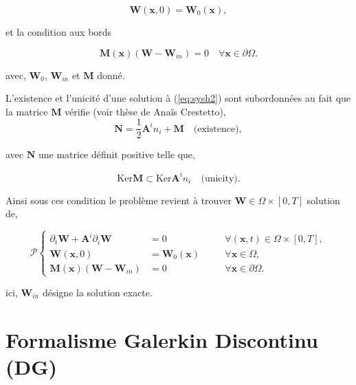 \documentclass[a4paper,oneside,10pt]{report}
\begin{document}
\begin{equation}
\label{eq:ini} 
\mathbf{W}(\mathbf{x},0)=\mathbf{W}_0(\mathbf{x}),
\end{equation}

et la condition aux bords

\begin{equation}
\label{eq:bound} 
\mathbf{M}(\mathbf{x})(\mathbf{W}-\mathbf{W}_{in})=0\quad\forall \mathbf{x} \in \partial \Omega.
\end{equation}

avec, $\mathbf{W}_0$, $\mathbf{W}_{in}$ et $\mathbf{M}$ donné.\newline

L'existence et l'unicité d'une solution à (\ref{eq:sysh2}) sont subordonnées au fait que la matrice $\mathbf{M}$ vérifie (voir thèse de Anaïs Crestetto),
\begin{equation}
\label{eq:ctr1}
\mathbf{N} = \frac{1}{2} \mathbf{A}^in_i + \mathbf{M}\quad \mbox{(existence)},
\end{equation}

avec $\mathbf{N}$ une matrice définit positive telle que,

\begin{equation}
\label{eq:ctr2}
\mbox{Ker}\mathbf{M} \subset \mbox{Ker}\mathbf{A}^in_i \quad \mbox{(unicity)}.
\end{equation}

Ainsi sous ces condition le problème revient à trouver  $\mathbf{W}\in\Omega \times [0,T]$ solution de,

\begin{equation}
\label{eq:final}
\mathcal{P} \left\{
\begin{aligned}
\partial_t \mathbf{W} +  \mathbf{A}^i\partial_i \mathbf{W} &= 0 &\quad &\forall (\mathbf{x},t) \in \Omega \times [0,T],\\
\mathbf{W}(\mathbf{x},0)&=\mathbf{W}_0(\mathbf{x}) &\quad &\forall \mathbf{x} \in \Omega,\\
\mathbf{M}(\mathbf{x})(\mathbf{W}-\mathbf{W}_{in})&=0&\quad&\forall \mathbf{x} \in \partial\Omega.
\end{aligned}
\right.
\end{equation}

ici, $\mathbf{W}_{in}$ désigne la solution exacte.

\section{Formalisme Galerkin Discontinu (DG)}
\end{document}
